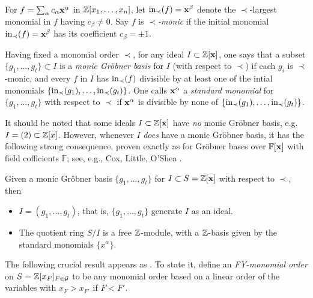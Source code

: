 \begin{defn}\rm
For $f=\sum_\alpha c_\alpha \mathbf{x}^\alpha$ in $\mathbb{Z}[x_1,\ldots,x_n]$,
let $\mathrm{in}_\prec(f)=\mathbf{x}^\beta$ denote the $\prec$-largest monomial in $f$ having $c_\beta \neq 0$.  Say $f$ is {\it $\prec$-monic} if the initial monomial $\mathrm{in}_\prec(f)=\mathbf{x}^\beta$ has its coefficient $c_\beta=\pm 1$.

Having fixed a monomial order $\prec$, for any ideal $I \subset \mathbb{Z}[\mathbf{x}]$, one says that a subset  $\{g_1,\ldots,g_t\} \subset I$ is a {\it monic Gr\"obner basis} for $I$ (with respect to $\prec$) if each $g_i$ is $\prec$-monic, and 
every $f$ in $I$ has $\mathrm{in}_\prec(f)$ divisible by at least one
of the intial monomials 
$\{ \mathrm{in}_\prec(g_1),\ldots,\mathrm{in}_\prec(g_t)\}$.
One calls $\mathbf{x}^\alpha$ a {\it standard monomial} for 
$\{g_1,\ldots,g_t\}$ with respect to $\prec$ if
$\mathbf{x}^\alpha$  is divisible by none of $\{ \mathrm{in}_\prec(g_1),\ldots,\mathrm{in}_\prec(g_t)\}$.
\end{defn}

It should be noted that some ideals $I \subset \mathbb{Z}[\mathbf{x}]$
have {\it no} monic Gr\"obner basis, e.g. $I=(2) \subset \mathbb{Z}[x]$.  However, whenever $I$ {\it does} have a monic Gr\"obner basis, it has the following strong consequence, proven exactly as for Gr\"obner bases over
$\mathbb{F}[\mathbf{x}]$ with field cofficients $\mathbb{F}$; see, e.g.,
Cox, Little, O'Shea \cite[\S2.5, 5.3]{CLO}.
\begin{prop}
\label{GB-basis-fact}
Given a monic Gr\"obner basis $\{g_1,\ldots,g_t\}$ for $I \subset S=\mathbb{Z}[\mathbf{x}]$ with respect to $\prec$, then
\begin{itemize}
\item $I=(g_1,\ldots,g_t)$, that is, $\{g_1,\ldots,g_t\}$ generate $I$ as an ideal.
\item The quotient ring $S/I$ is a free $\mathbb{Z}$-module, with
a $\mathbb{Z}$-basis given by the standard monomials $\{x^\alpha\}$.
\end{itemize}
\end{prop}

The following crucial result appears as \cite[Thm. 2]{FY}.  To state it, define an {\it FY-monomial order} on $S=\mathbb{Z}[x_F]_{F \in \mathcal{G}}$ to be any monomial order
based on a linear order of the variables with $x_F > x_{F'}$ if $F < F'$.

